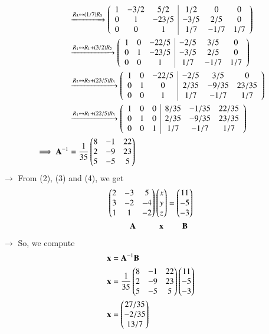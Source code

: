 \documentclass[journal]{IEEEtran}
\begin{document}
\begin{align}
&\xrightarrow{R_3 \leftrightarrow (1/7)R_3} \left(\begin{array}{ccc|ccc} 1&-3/2&5/2&1/2&0&0\\0&1&-23/5&-3/5&2/5&0\\0&0&1&1/7&-1/7&1/7 \end{array}\right) \\
&\xrightarrow{R_1 \leftrightarrow R_1 + (3/2)R_2} \left(\begin{array}{ccc|ccc} 1&0&-22/5&-2/5&3/5&0\\0&1&-23/5&-3/5&2/5&0\\0&0&1&1/7&-1/7&1/7 \end{array}\right) \\
&\xrightarrow{R_2 \leftrightarrow R_2 + (23/5)R_3} \left(\begin{array}{ccc|ccc} 1&0&-22/5&-2/5&3/5&0\\0&1&0&2/35&-9/35&23/35\\0&0&1&1/7&-1/7&1/7 \end{array}\right) \\
&\xrightarrow{R_1 \leftrightarrow R_1 + (22/5)R_3} \left(\begin{array}{ccc|ccc} 1&0&0&8/35&-1/35&22/35\\0&1&0&2/35&-9/35&23/35\\0&0&1&1/7&-1/7&1/7 \end{array}\right) \\
\implies \mathbf{A}^{-1} &= \frac{1}{35}\begin{pmatrix}8&-1&22\\2&-9&23\\5&-5&5\end{pmatrix}
\end{align}
$\rightarrow$ From (2), (3) and (4), we get
\begin{align}
    \begin{pmatrix}2&-3&5\\3&-2&-4\\1&1&-2\end{pmatrix} \begin{pmatrix}x\\y\\z\end{pmatrix} &= \begin{pmatrix}11\\-5\\-3\end{pmatrix} \\
    \mathbf{A}\hspace{1cm}\mathbf{x}\hspace{0.15cm} & \hspace{0.65cm}\mathbf{B} \notag
\end{align}
$\rightarrow$ So, we compute
\begin{align}
    \mathbf{x} &= \mathbf{A}^{-1} \mathbf{B} \\
    \mathbf{x} &= \frac{1}{35}\begin{pmatrix}8&-1&22\\2&-9&23\\5&-5&5\end{pmatrix}\begin{pmatrix}11\\-5\\-3\end{pmatrix} \\
    \mathbf{x} &= \begin{pmatrix}27/35\\-2/35\\13/7\end{pmatrix}
\end{align}
\end{document}
